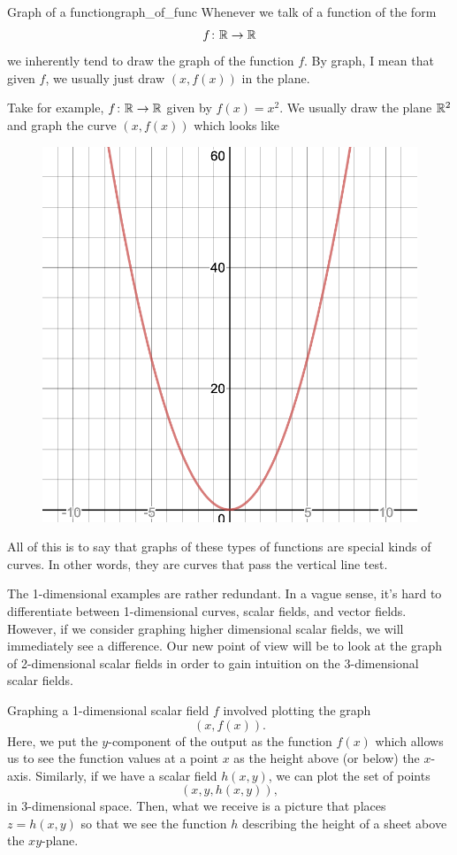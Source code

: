                 \begin{ex}{Graph of a function}{graph_of_func}
                Whenever we talk of a function of the form
                \[
                f\colon \mathbb{R} \to \mathbb{R}
                \]
                we inherently tend to draw the graph of the function $f$.  By graph, I mean that given $f$, we usually just draw $(x,f(x))$ in the plane.
                
                Take for example, $f\colon \mathbb{R} \to \mathbb{R}$ given by $f(x)=x^2$.  We usually draw the plane $\mathbb{R}^2$ and graph the curve $(x,f(x))$ which looks like
                \begin{figure}[H]
                    \centering
                    \includegraphics[width=.5\textwidth]{Figures_Part_6/quadratic_curve.png}           
                \end{figure}
                All of this is to say that graphs of these types of functions are special kinds of curves.  In other words, they are curves that pass the vertical line test. 
                \end{ex}
                
                The 1-dimensional examples are rather redundant.  In a vague sense, it's hard to differentiate between 1-dimensional curves, scalar fields, and vector fields.  However, if we consider graphing higher dimensional scalar fields, we will immediately see a difference.  Our new point of view will be to look at the graph of 2-dimensional scalar fields in order to gain intuition on the 3-dimensional scalar fields.  
                
                Graphing a 1-dimensional scalar field $f$ involved plotting the graph
                \[
                (x,f(x)).
                \]
                Here, we put the $y$-component of the output as the function $f(x)$ which allows us to see the function values at a point $x$ as the height above (or below) the $x$-axis. Similarly, if we have a scalar field $h(x,y)$, we can plot the set of points
                \[
                (x,y,h(x,y)),
                \]
                in 3-dimensional space.  Then, what we receive is a picture that places $z=h(x,y)$ so that we see the function $h$ describing the height of a sheet above the $xy$-plane.
                
